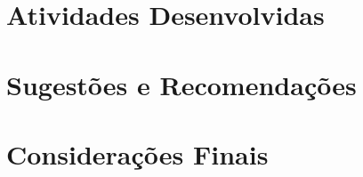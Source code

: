\documentclass[relatorio]{tex/unemat-comp}
\begin{document}
\chapter{Atividades Desenvolvidas}\label{chap:3-atividades}


\chapter{Sugestões e Recomendações}\label{chap:4-sugestões}


\chapter{Considerações Finais}\label{chap:5-consideracoes}




\cleardoublepage{}


\arial{}
\printbibliography[heading=bibintoc,title=\refname]


\end{document}
